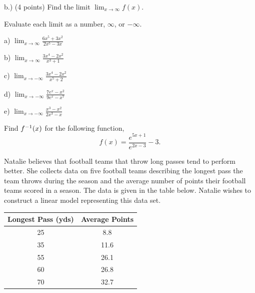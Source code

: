 \documentclass[11pt]{article}
\newcommand{\inv}{\ensuremath ^{-1}}
\begin{document}
\begin{questions}
b.) (4 points) Find the limit $\lim_{x\to \infty} f(x)$.
\vspace{2.25in}


\question[10] Evaluate each limit as a number, $\infty$, or $-\infty$.

a) $\displaystyle \lim_{x\to\infty} \frac{6x^5 + 3x^2}{2x^5 - 3x}$

\vspace{2.25in}

b) $\displaystyle \lim_{x\to\infty} \frac{3x^4 - 2x^2}{x^3 +1}$

\vspace{2.25in}

c) $\displaystyle \lim_{x\to-\infty} \frac{3x^4 - 2x^2}{x^5 +2}$

\vspace{2.25in}

d) $\displaystyle \lim_{x\to-\infty} \frac{7e^x - x^2}{9e^x -x^7}$

\vspace{2.25in}

e) $\displaystyle \lim_{x\to-\infty} \frac{x^3 - x^2}{2x^3 -x}$

\vspace{2.25in}


\question[10] Find $f\inv(x)$ for the following function,
\[f(x) = \frac{e^{5x+1}}{e^{2x-3}} - 3.\]

\vspace{3.25in}


\question[11] Natalie believes that football teams that throw long passes tend to perform better.  She collects data on five football teams describing the longest pass the team throws during the season and the average number of points their football teams scored in a season.  The data is given in the table below.  Natalie wishes to construct a linear model representing this data set.\\
\begin{center}
  \begin{tabular}{| c | c |}
    \hline
    Longest Pass (yds) & Average Points \\ \hline \hline
    25 & 8.8  \\ \hline
    35 & 11.6  \\ \hline
    55 & 26.1  \\ \hline
    60 & 26.8  \\ \hline
    70 & 32.7  \\ \hline
  \end{tabular}
\end{center}


\end{questions}
\end{document}

